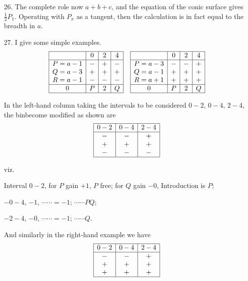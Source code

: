 \documentclass[11pt,a4paper]{article}
\theoremstyle{plain}
\theoremstyle{definition}
\theoremstyle{remark}
\begin{document}
26. The complete role now $a + b + c$, and the equation of the conic surface gives $\tfrac{1}{2} P_1$. Operating with $P_x$ as a tangent, then the calculation is in fact equal to the breadth in $a$.

27. I give some simple examples.
\[
\begin{array}{|c|c|c|c|}
\hline
 & 0 & 2 & 4 \\
\hline
P = a - 1 & - & + & - \\
Q = a - 3 & + & + & + \\
R = a - 1 & - & - & - \\
\hline
0 & P & 2 & Q \\
\hline
\end{array}
\quad
\begin{array}{|c|c|c|c|}
\hline
 & 0 & 2 & 4 \\
\hline
P = a - 3 & - & - & + \\
Q = a - 1 & + & + & + \\
R = a + 1 & + & + & + \\
\hline
0 & P & 2 & Q \\
\hline
\end{array}
\]

In the left-hand column taking the intervals to be considered $0 - 2$, $0 - 4$, $2 - 4$, the binbecome modified as shown are
\[
\begin{array}{|c|c|c|}
\hline
0 - 2 & 0 - 4 & 2 - 4 \\
\hline
- & - & + \\
+ & + & + \\
- & - & - \\
\hline
\end{array}
\]

viz.

Interval $0 - 2$, for $P$ gain $+1$, $P$ free; for $Q$ gain $-0$, Introduction is $P$;

\hspace{2em}$- 0 - 4$, \quad $- 1$, \quad $\cdots \cdots = -1$; \quad $\cdots \cdots PQ$;

\hspace{2em}$- 2 - 4$, \quad $- 0$, \quad $\cdots \cdots = -1$; \quad $\cdots \cdots Q$.

And similarly in the right-hand example we have
\[
\begin{array}{|c|c|c|}
\hline
0 - 2 & 0 - 4 & 2 - 4 \\
\hline
- & - & + \\
+ & + & + \\
+ & + & + \\
\hline
\end{array}
\]
\end{document}
